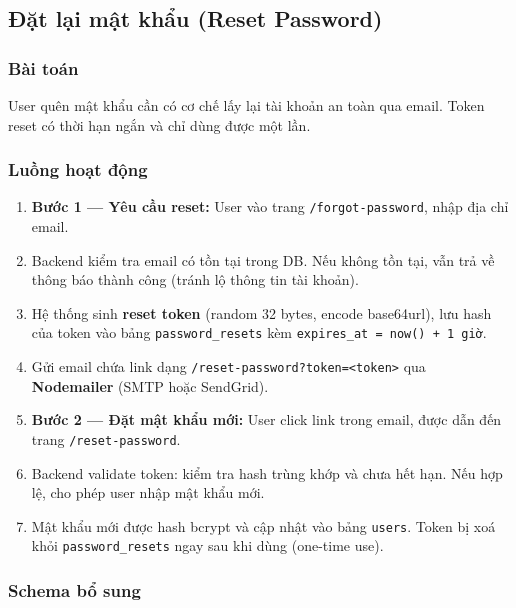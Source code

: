 \documentclass[12pt,a4paper]{article}
\begin{document}
\subsection{Đặt lại mật khẩu (Reset Password)}

\subsubsection{Bài toán}

User quên mật khẩu cần có cơ chế lấy lại tài khoản an toàn qua email.
Token reset có thời hạn ngắn và chỉ dùng được một lần.

\subsubsection{Luồng hoạt động}

\begin{enumerate}
  \item \textbf{Bước 1 --- Yêu cầu reset:} User vào trang
        \texttt{/forgot-password}, nhập địa chỉ email.
  \item Backend kiểm tra email có tồn tại trong DB. Nếu không tồn tại,
        vẫn trả về thông báo thành công (tránh lộ thông tin tài khoản).
  \item Hệ thống sinh \textbf{reset token} (random 32 bytes, encode
        base64url), lưu hash của token vào bảng \texttt{password\_resets}
        kèm \texttt{expires\_at = now() + 1 giờ}.
  \item Gửi email chứa link dạng
        \texttt{/reset-password?token=<token>} qua \textbf{Nodemailer}
        (SMTP hoặc SendGrid).
  \item \textbf{Bước 2 --- Đặt mật khẩu mới:} User click link trong
        email, được dẫn đến trang \texttt{/reset-password}.
  \item Backend validate token: kiểm tra hash trùng khớp và chưa hết hạn.
        Nếu hợp lệ, cho phép user nhập mật khẩu mới.
  \item Mật khẩu mới được hash bcrypt và cập nhật vào bảng \texttt{users}.
        Token bị xoá khỏi \texttt{password\_resets} ngay sau khi dùng
        (one-time use).
\end{enumerate}

\subsubsection{Schema bổ sung}
\end{document}
